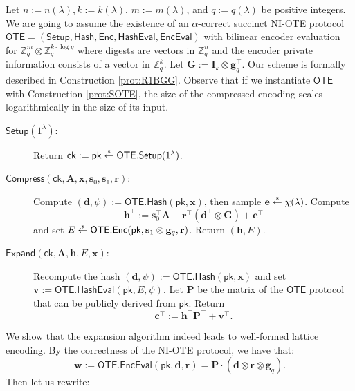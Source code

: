 \documentclass{theoretics}
\newcommand{\getsr}{\overset{\raisebox{-1pt}{$\scriptscriptstyle \$$}}{\gets}}
\newcommand{\sample}{\getsr}
\newcommand{\OTE}{\mathsf{OTE}}
\newcommand{\Z}{\mathbb{Z}}
\renewcommand{\sec}{\ensuremath{\lambda}}
\newcommand{\secpar}{\sec}
\newcommand{\Compress}{\mathsf{Compress}}
\newcommand{\ck}{\mathsf{ck}}
\newcommand{\algofont}[1]{\ensuremath{\mathsf{#1}}}
\newcommand{\Enc}{{\algofont{Enc}}}
\newcommand{\Setup}{{\algofont{Setup}}}
\newcommand{\Eval}{\algofont{Eval}\xspace}
\newcommand{\Hash}{{\algofont{Hash}}}
\newcommand{\Expand}{\algofont{Expand}}
\newcommand{\id}{\ensuremath{\mathbf{I}}}
\newcommand{\pk}{{\mathsf{pk}}}
\newcommand\bbbone{1}
\newenvironment{protocol}[1][]
{\begin{algorithm}\caption{#1}}
  {\end{algorithm}}
\begin{document}
Let $n:=n(\sec), k:=k(\sec)$, $m:=m(\sec)$, and $q:=q(\sec)$ be positive integers. We are going to assume the existence of an $\alpha$-correct succinct NI-OTE protocol $\OTE=(\Setup, \allowbreak\Hash, \allowbreak\Enc, \allowbreak\Hash\Eval, \allowbreak\Enc\Eval)$ with bilinear encoder evaluation for $\Z_q^{m}\otimes\Z_q^{k\cdot\log q}$ where digests are vectors in $\Z_q^n$ and the encoder private information consists of a vector in $\Z_q^k$. Let $\mathbf{G}:=\id_k\otimes \mathbf{g}_q^\intercal$. Our scheme is formally described in Construction \ref{prot:R1BGG}. Observe that if we instantiate $\OTE$ with Construction \ref{prot:SOTE}, the size of the compressed encoding scales logarithmically in the size of its input.



\begin{protocol}[Compression of Lattice Encodings]\label{prot:R1BGG}

\begin{description}
\item[$\Setup(1^\secpar)$:] Return $\ck:= \pk\sample \OTE.\Setup(\bbbone^\sec)$.

\item[$\Compress(\ck, \mathbf{A}, \mathbf{x}, \mathbf{s}_0, \mathbf{s}_1, \mathbf{r})$:]  Compute $(\mathbf{d}, \psi) := \OTE.\Hash(\pk, \mathbf{x})$, then sample $\mathbf{e}\sample\chi(\sec)$. Compute
\[
\mathbf{h}^\intercal:= \mathbf{s}_0^\intercal \mathbf{A}+\mathbf{r}^\intercal (\mathbf{d}^\intercal \otimes \mathbf{G})+\mathbf{e}^\intercal
\]
and set $E\sample \OTE.\Enc(\pk, \mathbf{s}_1\otimes \mathbf{g}_q, \mathbf{r})$. Return 
$(\mathbf{h}, E)$.

 \item[$\Expand(\ck, \mathbf{A}, \mathbf{h}, E, \mathbf{x})$:] Recompute the hash 
 $(\mathbf{d}, \psi) := \OTE.\Hash(\pk, \mathbf{x})$ and set $\mathbf{v}:=\OTE.\Hash\Eval(\pk, E, \psi)$. Let $\mathbf{P}$ be the matrix of the $\OTE$ protocol that can be publicly derived from $\pk$. Return
 \[
 \mathbf{c}^\intercal:=\mathbf{h}^\intercal \mathbf{P}^\intercal+\mathbf{v}^\intercal.
 \]
\end{description}
\end{protocol}
We show that the expansion algorithm indeed leads to well-formed lattice encoding. By the correctness of the NI-OTE protocol, we have that:
\[
\mathbf{w}:=\OTE.\Enc\Eval(\pk, \mathbf{d}, \mathbf{r})=\mathbf{P}\cdot(\mathbf{d} \otimes \mathbf{r}\otimes \mathbf{g}_q).
\]
Then let us rewrite:
\end{document}
